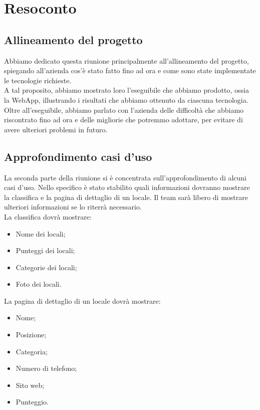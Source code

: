 \section{Resoconto}


\subsection{Allineamento del progetto}

Abbiamo dedicato questa riunione principalmente all'allineamento del progetto, spiegando all'azienda cos'è stato fatto fino ad ora e come sono state implementate le tecnologie richieste. \\
A tal proposito, abbiamo mostrato loro l'eseguibile che abbiamo prodotto, ossia la WebApp, illustrando i risultati che abbiamo ottenuto da ciascuna tecnologia. \\

Oltre all'eseguibile, abbiamo parlato con l'azienda delle difficoltà che abbiamo riscontrato fino ad ora e delle migliorie che potremmo adottare, per evitare di avere ulteriori problemi in futuro. 

\subsection{Approfondimento casi d'uso}

La seconda parte della riunione si è concentrata sull'approfondimento di alcuni casi d'uso. Nello specifico è stato stabilito quali informazioni dovranno mostrare la classifica e la pagina di dettaglio di un locale. Il team sarà libero di mostrare ulteriori informazioni se lo riterrà necessario. \\
La classifica dovrà mostrare:
\begin{itemize}
	\item Nome dei locali;
	\item Punteggi dei locali;
	\item Categorie dei locali;
	\item Foto dei locali.
\end{itemize}
La pagina di dettaglio di un locale dovrà mostrare:
\begin{itemize}
	\item Nome;
	\item Posizione;
	\item Categoria;
	\item Numero di telefono;
	\item Sito web;
	\item Punteggio.
\end{itemize}




